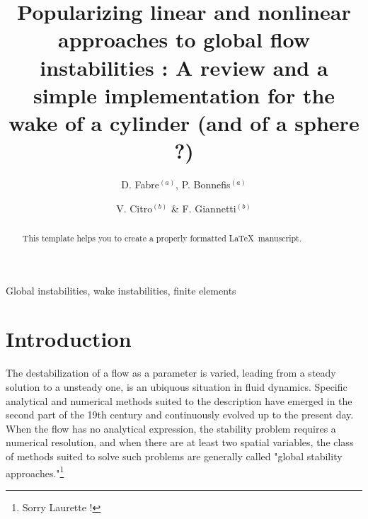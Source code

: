 \documentclass{elsarticle}
\begin{document}
\begin{frontmatter}

\title{Popularizing linear and nonlinear approaches to global flow instabilities : 
A review and a simple implementation for the wake of a cylinder (and of a sphere ?)}%


\author{D. Fabre$^{(a)}$, P. Bonnefis$^{(a)}$}
\address[IMFT]{IMFT, University of Toulouse}
\author{ V. Citro$^{(b)}$ \& F. Giannetti$^{(b)}$}
\address[Salerno]{University of Salerno}





\begin{abstract}
This template helps you to create a properly formatted \LaTeX\ manuscript.
\end{abstract}

\begin{keyword}
Global instabilities, wake instabilities, finite elements
\end{keyword}

\end{frontmatter}

\linenumbers

\section{Introduction}

The destabilization of a flow as a parameter is varied, leading from a steady solution to a unsteady one, is an ubiquous situation in fluid dynamics. Specific analytical and numerical methods suited to the description have emerged in the second part of the 19th century and continuously evolved up to the present day. When the flow has no analytical expression, the stability problem requires a numerical resolution, and when there are at least two spatial variables, the class of methods suited to solve such problems are generally called "global stability approaches."\footnote{Sorry Laurette !}
\end{document}
